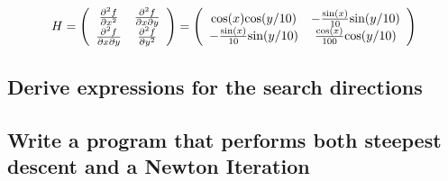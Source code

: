 \documentclass{article}
\begin{document}
\begin{equation*}
H = \left(
  \begin{array}{ c c }
     \frac{\partial^2 f}{\partial x^2} & \frac{\partial^2 f}{\partial x
      \partial y} \\
     \frac{\partial^2 f}{\partial x
      \partial y} & \frac{\partial^2 f}{\partial y^2}
  \end{array} \right)
= 
\left(
  \begin{array}{ c c }
     \text{cos}(x)\text{cos}(y/10) & -\frac{\text{sin}(x)}{10}\text{sin}(y/10) \\
     -\frac{\text{sin}(x)}{10}\text{sin}(y/10) & \frac{\text{cos}(x)}{100}\text{cos}(y/10)
  \end{array} \right)
\end{equation*}

\subsection{Derive expressions for the search directions}

\subsection{Write a program that performs both steepest descent and a
  Newton Iteration}




\end{document}

